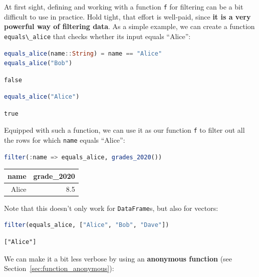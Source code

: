 \documentclass[
  notoc %
]{tufte-book}
\newcommand{\passthrough}[1]{#1}
\begin{document}
At first sight, defining and working with a function
\passthrough{\lstinline!f!} for filtering can be a bit difficult to use
in practice. Hold tight, that effort is well-paid, since \textbf{it is a
very powerful way of filtering data}. As a simple example, we can create
a function \passthrough{\lstinline!equals\_alice!} that checks whether
its input equals ``Alice'':

\begin{lstlisting}[language=Julia]
equals_alice(name::String) = name == "Alice"
equals_alice("Bob")
\end{lstlisting}

\begin{lstlisting}[language=Output]
false
\end{lstlisting}

\begin{lstlisting}[language=Julia]
equals_alice("Alice")
\end{lstlisting}

\begin{lstlisting}[language=Output]
true
\end{lstlisting}

Equipped with such a function, we can use it as our function
\passthrough{\lstinline!f!} to filter out all the rows for which
\passthrough{\lstinline!name!} equals ``Alice'':

\begin{lstlisting}[language=Julia]
filter(:name => equals_alice, grades_2020())
\end{lstlisting}

\begin{longtable}[]{@{}rr@{}}
\toprule
name & grade\_2020 \\
\midrule
\endhead
Alice & 8.5 \\
\bottomrule
\end{longtable}

Note that this doesn't only work for
\passthrough{\lstinline!DataFrame!}s, but also for vectors:

\begin{lstlisting}[language=Julia]
filter(equals_alice, ["Alice", "Bob", "Dave"])
\end{lstlisting}

\begin{lstlisting}[language=Output]
["Alice"]
\end{lstlisting}

We can make it a bit less verbose by using an \textbf{anonymous
function} (see Section~\ref{sec:function_anonymous}):
\end{document}

